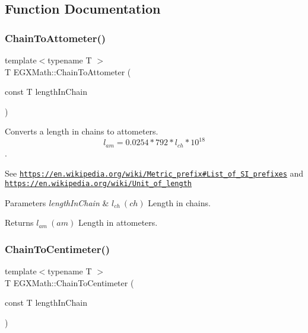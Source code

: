 \subsection{Function Documentation}
\mbox{\label{group___e_g_x_math-_conversions-_length_conversions-_imperial-_chain-_s_i_ga1e983c3063080200438c09bdafa20e02}} 
\subsubsection{\texorpdfstring{Chain\+To\+Attometer()}{ChainToAttometer()}}
{\footnotesize\ttfamily template$<$typename T $>$ \\
T E\+G\+X\+Math\+::\+Chain\+To\+Attometer (\begin{DoxyParamCaption}\item[{const T}]{length\+In\+Chain }\end{DoxyParamCaption})}



Converts a length in chains to attometers. \[ l_{am}=0.0254 * 792 * l_{ch} * 10^{18} \]. 

See \href{https://en.wikipedia.org/wiki/Metric_prefix#List_of_SI_prefixes}{\tt https\+://en.\+wikipedia.\+org/wiki/\+Metric\+\_\+prefix\#\+List\+\_\+of\+\_\+\+S\+I\+\_\+prefixes} and \href{https://en.wikipedia.org/wiki/Unit_of_length}{\tt https\+://en.\+wikipedia.\+org/wiki/\+Unit\+\_\+of\+\_\+length} 
\begin{DoxyParams}{Parameters}
{\em length\+In\+Chain} & $ l_{ch}\ (ch)$ Length in chains. \\
\hline
\end{DoxyParams}
\begin{DoxyReturn}{Returns}
$ l_{am}\ (am)$ Length in attometers. 
\end{DoxyReturn}
\mbox{\label{group___e_g_x_math-_conversions-_length_conversions-_imperial-_chain-_s_i_ga33a053c1566c1371a9ac3a5ce66340bf}} 
\subsubsection{\texorpdfstring{Chain\+To\+Centimeter()}{ChainToCentimeter()}}
{\footnotesize\ttfamily template$<$typename T $>$ \\
T E\+G\+X\+Math\+::\+Chain\+To\+Centimeter (\begin{DoxyParamCaption}\item[{const T}]{length\+In\+Chain }\end{DoxyParamCaption})}



